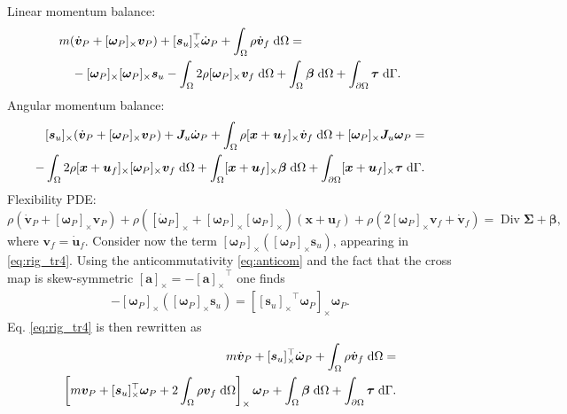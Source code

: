 \documentclass{svjour3}                     %
\DeclareMathOperator*{\Div}{Div}
\newcommand{\crmat}[1]{\ensuremath{[#1]_{\times}}}
\begin{document}
\indent Linear momentum balance:
\begin{equation}
\label{eq:rig_tr4}
\begin{split}
&m (\dot{\bm{v}}_P + \crmat{\bm{\omega}_P} \bm{v}_P) + \crmat{\bm{s}_u}^\top \dot{\bm{\omega}}_P  + \int_{\Omega} \rho \dot{\bm{v}}_f \d{\Omega} = \\
&\quad - \crmat{\bm{\omega}_P} \crmat{\bm{\omega}_P} \bm{s}_u - \int_{\Omega} 2 \rho \crmat{\bm{\omega}_P} {\bm{v}}_f \d{\Omega} +  \int_{\Omega} \bm\beta \d{\Omega} + \int_{\partial \Omega} \bm\tau \d{\Gamma}.
\end{split}
\end{equation}
\indent Angular momentum balance:
\begin{equation}
\label{eq:rig_rot4}
\begin{split}
\crmat{\bm{s}_u} (\dot{\bm{v}}_P + \crmat{\bm{\omega}_P} \bm{v}_P) + \bm{J}_u \dot{\bm\omega}_P + \int_{\Omega} \rho \crmat{\bm{x}+\bm{u}_f} \dot{\bm{v}}_f \d{\Omega} + \crmat{\bm{\omega}_P} \bm{J}_u \bm{\omega}_P = \\ 
- \int_{\Omega} 2\rho \crmat{\bm{x}+\bm{u}_f} \crmat{\bm\omega_P} {\bm{v}}_f \d{\Omega} + \int_{\Omega}\crmat{\bm{x}+\bm{u}_f} \bm\beta \d{\Omega} + \int_{\partial \Omega}\crmat{\bm{x}+\bm{u}_f} \bm\tau \d{\Gamma}. \\
\end{split}
\end{equation}
\indent Flexibility PDE:
\begin{equation}
\label{eq:flex4}
\rho (\dot{\bm{v}}_P + \crmat{\bm\omega_P} \bm{v}_P) + \rho (\crmat{\dot{\bm\omega}_P} + \crmat{\bm{\omega}_P}\crmat{\bm{\omega}_P})(\bm{x}+\bm{u}_f) + \rho (2 \crmat{\bm{\omega}_P} {\bm{v}}_f + \dot{\bm{v}}_f) = \Div{\bm\Sigma} + \bm\beta,
\end{equation}
where $\bm{v}_f = \dot{\bm{u}}_f$. Consider now the term $\crmat{\bm{\omega}_P} (\crmat{\bm{\omega}_P} \bm{s}_u)$, appearing in \eqref{eq:rig_tr4}. Using the anticommutativity \eqref{eq:anticom} and the fact that the cross map is skew-symmetric $\crmat{\bm{a}} = -\crmat{\bm{a}}^\top$ one finds
\begin{align*}
-\crmat{\bm{\omega}_P} (\crmat{\bm{\omega}_P} \bm{s}_u) = \crmat{\crmat{\bm{s}_u}^\top\bm{\omega}_{P}} \bm{\omega}_{P}.
\end{align*}
Eq. \eqref{eq:rig_tr4} is then rewritten as
\begin{equation}
\label{eq:rig_tr5}
\begin{split}
m\dot{\bm{v}}_P + \crmat{\bm{s}_u}^\top \dot{\bm{\omega}}_P +   \int_{\Omega} \rho \dot{\bm{v}}_f \d{\Omega}  = \\
\left[m \bm{v}_P + \crmat{\bm{s}_u}^\top \bm\omega_P +2 \int_{\Omega} \rho \bm{v}_f \d{\Omega} \right]_\times \bm\omega_P +  \int_{\Omega} \bm\beta \d{\Omega} + \int_{\partial \Omega} \bm\tau \d{\Gamma}.
\end{split}
\end{equation}
\end{document}
